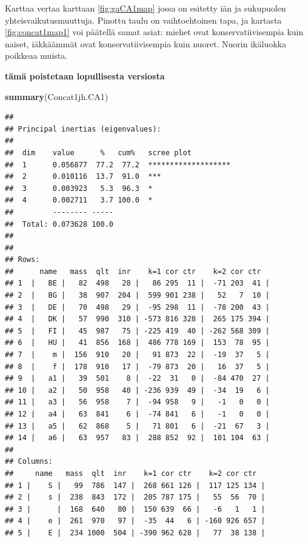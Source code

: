 \documentclass[
  finnish,
]{book}
\newenvironment{Shaded}{\begin{snugshade}}{\end{snugshade}}
\newcommand{\KeywordTok}[1]{\textcolor[rgb]{0.13,0.29,0.53}{\textbf{#1}}}
\newcommand{\NormalTok}[1]{#1}
\begin{document}
Karttaa vertaa karttaan \ref{fig:gaCA1map} jossa on esitetty iän ja sukupuolen
yhteisvaikutusmuuttuja. Pinottu taulu on vaihtoehtoinen tapa, ja kartasta
\ref{fig:concat1map1} voi päätellä samat asiat: miehet ovat konservatiivisempia
kuin naiset, iäkkäämmät ovat konservatiivisempia kuin nuoret. Nuorin ikäluokka
poikkeaa muista.

\textbf{tämä poistetaan lopullisesta versiosta}

\begin{Shaded}
\begin{Highlighting}[]
\KeywordTok{summary}\NormalTok{(Concat1jh.CA1)}
\end{Highlighting}
\end{Shaded}

\begin{verbatim}
## 
## Principal inertias (eigenvalues):
## 
##  dim    value      %   cum%   scree plot               
##  1      0.056877  77.2  77.2  *******************      
##  2      0.010116  13.7  91.0  ***                      
##  3      0.003923   5.3  96.3  *                        
##  4      0.002711   3.7 100.0  *                        
##         -------- -----                                 
##  Total: 0.073628 100.0                                 
## 
## 
## Rows:
##      name   mass  qlt  inr    k=1 cor ctr    k=2 cor ctr  
## 1  |   BE |   82  498   28 |   86 295  11 |  -71 203  41 |
## 2  |   BG |   38  907  204 |  599 901 238 |   52   7  10 |
## 3  |   DE |   70  498   29 |  -95 298  11 |  -78 200  43 |
## 4  |   DK |   57  990  310 | -573 816 328 |  265 175 394 |
## 5  |   FI |   45  987   75 | -225 419  40 | -262 568 309 |
## 6  |   HU |   41  856  168 |  486 778 169 |  153  78  95 |
## 7  |    m |  156  910   20 |   91 873  22 |  -19  37   5 |
## 8  |    f |  178  910   17 |  -79 873  20 |   16  37   5 |
## 9  |   a1 |   39  501    8 |  -22  31   0 |  -84 470  27 |
## 10 |   a2 |   50  958   40 | -236 939  49 |  -34  19   6 |
## 11 |   a3 |   56  958    7 |  -94 958   9 |   -1   0   0 |
## 12 |   a4 |   63  841    6 |  -74 841   6 |   -1   0   0 |
## 13 |   a5 |   62  868    5 |   71 801   6 |  -21  67   3 |
## 14 |   a6 |   63  957   83 |  288 852  92 |  101 104  63 |
## 
## Columns:
##     name   mass  qlt  inr    k=1 cor ctr    k=2 cor ctr  
## 1 |    S |   99  786  147 |  268 661 126 |  117 125 134 |
## 2 |    s |  238  843  172 |  205 787 175 |   55  56  70 |
## 3 |      |  168  640   80 |  150 639  66 |   -6   1   1 |
## 4 |    e |  261  970   97 |  -35  44   6 | -160 926 657 |
## 5 |    E |  234 1000  504 | -390 962 628 |   77  38 138 |
\end{verbatim}
\end{document}

